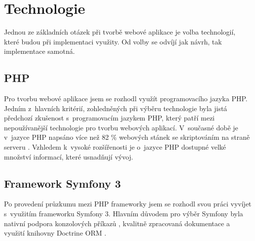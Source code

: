 \section{Technologie}
Jednou ze základních otázek při tvorbě webové aplikace je volba technologií, které budou při implementaci využity. Od volby se odvíjí jak návrh, tak implementace samotná. 

\subsection{PHP}
Pro tvorbu webové aplikace jsem se rozhodl využít programovacího jazyka \gls{PHP}. Jedním z~hlavních kritérií, zohledněných při výběru technologie byla jistá předchozí zkušenost s~programovacím jazykem PHP, který patří mezi nepoužívanější technologie pro tvorbu webových aplikací. V~současné době je v~jazyce PHP napsáno více než 82 \% webových stánek se skriptováním na straně serveru \autocite{web:statistics}. Vzhledem k~vysoké rozšířenosti je o~jazyce PHP dostupné velké množství informací, které usnadňují vývoj. 

\subsection{Framework Symfony 3}
Po provedení průzkumu mezi PHP frameworky jsem se rozhodl svou práci vyvíjet s~využitím frameworku Symfony 3. Hlavním důvodem pro výběr Symfony byla nativní podpora konzolových příkazů \autocite{symfony:console}, kvalitně zpracovaná dokumentace a využití knihovny Doctrine \gls{ORM} \autocite{symfony:doctrine}.